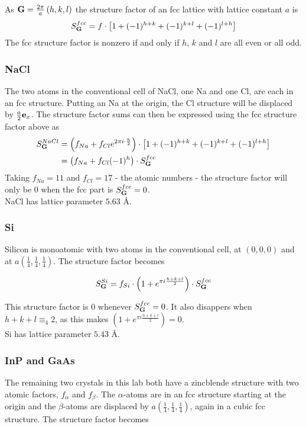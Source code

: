\documentclass[a4paper,twoside=false,abstract=false,numbers=noenddot,
titlepage=false,headings=small,parskip=half,version=last]{scrartcl}
\begin{document}
As $\bold{G} = \frac{2\pi}{a}\left( h,k,l \right)$ the structure factor of an fcc lattice with lattice constant $a$ is
\begin{equation}
    S^{fcc}_{\bold{G}} = f\cdot \left[ 1 + (-1)^{h+k} + (-1)^{k+l} + (-1)^{l+h}\right]\nonumber
\end{equation}
The fcc structure factor is nonzero if and only if $h$, $k$ and $l$ are all even or all odd.\\

\subsubsection{NaCl}
The two atoms in the conventional cell of NaCl, one Na and one Cl, are each in an fcc structure.
Putting an Na at the origin, the Cl structure will be displaced by $\frac{a}{2}\bold{e}_x$.
The structure factor sums can then be expressed using the fcc structure factor above as
\begin{align}
    S^{NaCl}_{\bold{G}}
    &= \left( f_{Na} + f_{Cl}e^{2\pi i\cdot \frac{h}{2}} \right) \cdot \left[ 1 + (-1)^{h+k} + (-1)^{k+l} + (-1)^{l+h}\right]\nonumber\\
    &= \left( f_{Na} + f_{Cl}(-1)^{h} \right) \cdot S^{fcc}_{\bold{G}}\nonumber
\end{align}
Taking $f_{Na}=11$ and $f_{Cl}=17$ - the atomic numbers - the structure factor will only be $0$ when the fcc part is $S^{fcc}_{\bold{G}}=0$.\\
NaCl has lattice parameter $5.63$ Å.

\subsubsection{Si}
Silicon is monoatomic with two atoms in the conventional cell, at $(0,0,0)$ and at $a(\frac{1}{4},\frac{1}{4},\frac{1}{4})$.
The structure factor becomes

\begin{equation}
    \label{eq:sistructure}
    S^{Si}_{\bold{G}}
    = f_{Si}\cdot \left( 1 + e^{\pi i \frac{h+k+l}{2}} \right) \cdot S^{fcc}_{\bold{G}}\nonumber
\end{equation}

This structure factor is $0$ whenever $S^{fcc}_{\bold{G}}=0$. It also disappers when $h+k+l\equiv_4 2$, as this makes $\left( 1 + e^{\pi i \frac{h+k+l}{2}} \right)=0$.\\
Si has lattice parameter $5.43$ Å.

\subsubsection{InP and GaAs}
The remaining two crystals in this lab both have a zincblende structure with two atomic factors, $f_\alpha$ and $f_\beta$.
The $\alpha$-atoms are in an fcc structure starting at the origin and the $\beta$-atoms are displaced by $a(\frac{1}{4},\frac{1}{4},\frac{1}{4})$, again in a cubic fcc structure.
The structure factor becomes
\end{document}
